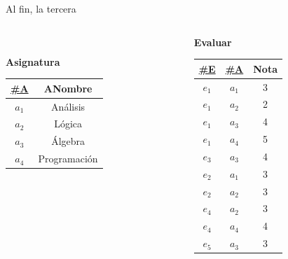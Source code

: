 \begin{frame}{Al fin, la tercera}
\begin{columns}[T]
\begin{column}{0.68\linewidth}
\begin{columns}[T]
\begin{column}{0.4\textwidth}
\begin{center}
\begin{tabular}{cc}
                        \end{tabular}
                    \end{center}
                \end{column}
                
            \end{columns}

            \begin{center}
                \textbf{Asignatura}\\[2mm]

                \begin{tabular}{cc}
                    \underline{\#A} & ANombre\\[1mm]
                    \hline
                    $a_1$ & An\'alisis\\
                    $a_2$ & L\'ogica \\
                    $a_3$ & \'Algebra\\
                    $a_4$ & Programaci\'on
                    
                \end{tabular}
            \end{center}
            
        \end{column}

        \begin{column}{0.3\linewidth}
            \vspace{6mm}
            \begin{center}
                \textbf{Evaluar}\\[2mm]

                \begin{tabular}{ccc}
                    \underline{\#E} & \underline{\#A} & Nota\\[1mm]
                    \hline
                    $e_1$ & $a_1$ & 3\\
                    $e_1$ & $a_2$ & 2\\
                    $e_1$ & $a_3$ & 4\\
                    $e_1$ & $a_4$ & 5\\
                    $e_3$ & $a_3$ & 4\\
                    $e_2$ & $a_1$ & 3\\
                    $e_2$ & $a_2$ & 3\\
                    $e_4$ & $a_2$ & 3\\
                    $e_4$ & $a_4$ & 4\\
                    $e_5$ & $a_3$ & 3\\
                \end{tabular}
            \end{center}
        \end{column}
    \end{columns}
\end{frame}



